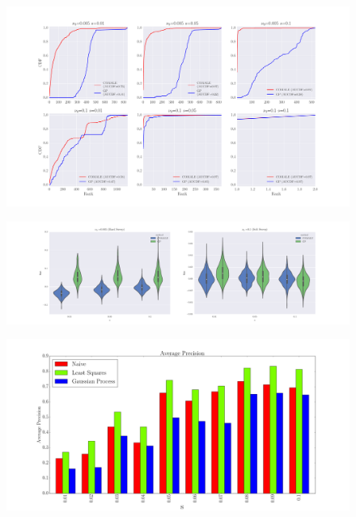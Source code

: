 \begin{figure}
  \centering
    \includegraphics[width=\textwidth]{rank}
\end{figure}

\begin{figure}
  \centering
    \includegraphics[width=\textwidth]{bias}
\end{figure}

\begin{figure}
  \centering
    \includegraphics[width=\textwidth]{ap}
\end{figure}